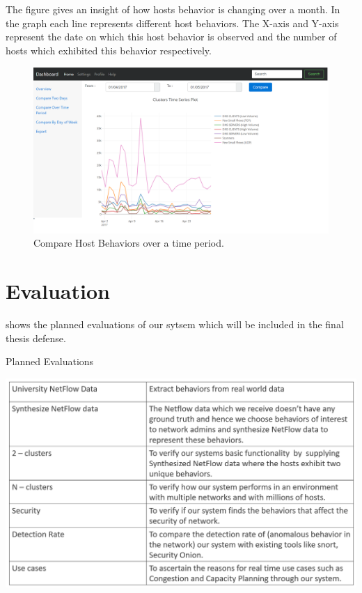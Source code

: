 The figure  gives an insight of how hosts behavior is changing over a month.
In the graph each line represents different host behaviors. The X-axis and Y-axis
represent the date on which this host behavior is observed and the number of hosts
which exhibited this behavior respectively.

\begin{figure}[t]
	\centerline{\includegraphics[scale = 0.45]{tool_compare_week.png}}
	\caption{Compare Host Behaviors over a time period.}%
\end{figure} 



\section{Evaluation}

 shows the planned evaluations of our sytsem which will be included in the final thesis defense.

\begin{table}[b]
	\caption{Planned Evaluations}%
	\centerline{\includegraphics[scale = 0.6]{evaluation.png}}
\end{table}


